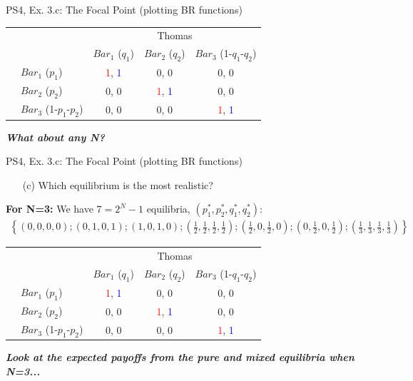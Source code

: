\begin{frame}{PS4, Ex. 3.c: The Focal Point (plotting BR functions)}
\begin{table}
      \begin{tabular}{cl|c|c|c|}
        & \multicolumn{1}{c}{} & \multicolumn{3}{c}{\color{blue}Thomas}\\
        & \multicolumn{1}{c}{} & \multicolumn{1}{c}{$Bar_1$ ($q_1$)} & \multicolumn{1}{c}{$Bar_2$ ($q_2$)} & \multicolumn{1}{c}{$Bar_3$ (1-$q_1$-$q_2$)} \\\cline{3-5}
        \parbox[t]{1mm}{}
        & $Bar_1$ ($p_1$) & \textcolor{red}{1}, \textcolor{blue}{1} & 0, 0 & 0, 0 \\
        & $Bar_2$ ($p_2$) & 0, 0 & \textcolor{red}{1}, \textcolor{blue}{1} & 0, 0 \\
        & $Bar_3$ (1-$p_1$-$p_2$) & 0, 0 & 0, 0 & \textcolor{red}{1}, \textcolor{blue}{1} \\
      \end{tabular}
    \end{table}
    \textbf{\textit{What about any N?}}
\end{frame}
\begin{frame}{PS4, Ex. 3.c: The Focal Point (plotting BR functions)}
    \begin{itemize}
      \item[(c)] Which equilibrium is the most realistic?
    \end{itemize}
    \textbf{For N=3:} We have $7=2^N-1$ equilibria, $(p_1^{*},p_2^{*},q_1^{*},q_2^{*})$:
    \begin{align*}
      \left\{(0,0,0,0);(0,1,0,1);(1,0,1,0)
      ;\left(\frac{1}{2},\frac{1}{2},\frac{1}{2},\frac{1}{2}\right)
      ;\left(\frac{1}{2},0,\frac{1}{2},0\right)
      ;\left(0,\frac{1}{2},0,\frac{1}{2}\right)
      ;\left(\frac{1}{3},\frac{1}{3},\frac{1}{3},\frac{1}{3}\right)
      \right\}
    \end{align*}
    \vspace{-18pt}
    \begin{table}
      \begin{tabular}{cl|c|c|c|}
        & \multicolumn{1}{c}{} & \multicolumn{3}{c}{\color{blue}Thomas}\\
        & \multicolumn{1}{c}{} & \multicolumn{1}{c}{$Bar_1$ ($q_1$)} & \multicolumn{1}{c}{$Bar_2$ ($q_2$)} & \multicolumn{1}{c}{$Bar_3$ (1-$q_1$-$q_2$)} \\\cline{3-5}
        \parbox[t]{1mm}{}
        & $Bar_1$ ($p_1$) & \textcolor{red}{1}, \textcolor{blue}{1} & 0, 0 & 0, 0 \\
        & $Bar_2$ ($p_2$) & 0, 0 & \textcolor{red}{1}, \textcolor{blue}{1} & 0, 0 \\
        & $Bar_3$ (1-$p_1$-$p_2$) & 0, 0 & 0, 0 & \textcolor{red}{1}, \textcolor{blue}{1} \\
      \end{tabular}
    \end{table}
    \textbf{\textit{Look at the expected payoffs from the pure and mixed equilibria when N=3...}}
\end{frame}
